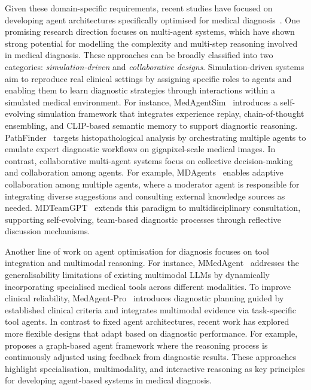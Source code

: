 \documentclass[]{selfevolagent}
\theoremstyle{plain}
\theoremstyle{definition}
\theoremstyle{remark}
\begin{document}
Given these domain-specific requirements, recent studies have focused on developing agent architectures specifically optimised for medical diagnosis~\citep{li2024mmedagent,almansoori2025self,ghezloo2025pathfinder, wang2025medagent}. One promising research direction focuses on multi-agent systems, which have shown strong potential for modelling the complexity and multi-step reasoning involved in medical diagnosis. These approaches can be broadly classified into two categories: \textit{simulation-driven} and \textit{collaborative designs}. Simulation-driven systems aim to reproduce real clinical settings by assigning specific roles to agents and enabling them to learn diagnostic strategies through interactions within a simulated medical environment.
For instance, MedAgentSim~\citep{almansoori2025self} introduces a self-evolving simulation framework that integrates experience replay, chain-of-thought ensembling, and CLIP-based semantic memory to support diagnostic reasoning. PathFinder~\citep{ghezloo2025pathfinder} targets histopathological analysis by orchestrating multiple agents to emulate expert diagnostic workflows on gigapixel-scale medical images. In contrast, collaborative multi-agent systems focus on collective decision-making and collaboration among agents. For example, MDAgents~\citep{kim2024mdagents} enables adaptive collaboration among multiple agents, where a moderator agent is responsible for integrating diverse suggestions and consulting external knowledge sources as needed. MDTeamGPT~\citep{chen2025mdteamgpt} extends this paradigm to multidisciplinary consultation, supporting self-evolving, team-based diagnostic processes through reflective discussion mechanisms. 

Another line of work on agent optimisation for diagnosis focuses on tool integration and multimodal reasoning. For instance, MMedAgent~\citep{li2024mmedagent} addresses the generalisability limitations of existing multimodal LLMs by dynamically incorporating specialised medical tools across different modalities. To improve clinical reliability, MedAgent-Pro~\citep{wang2025medagent} introduces diagnostic planning guided by established clinical criteria and integrates multimodal evidence via task-specific tool agents. In contrast to fixed agent architectures, recent work has explored more flexible designs that adapt based on diagnostic performance. For example, \cite{zhuang2025learning} proposes a graph-based agent framework where the reasoning process is continuously adjusted using feedback from diagnostic results. 
These approaches highlight specialisation, multimodality, and interactive reasoning as key principles for developing agent-based systems in medical diagnosis. 
\end{document}
